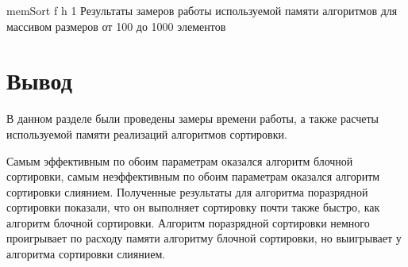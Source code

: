 \clearpage

{memSort} %
{f} %
{h} %
{1\textwidth} %
{Результаты замеров работы используемой памяти алгоритмов для массивом размеров от 100 до 1000 элементов} %

\section*{Вывод}

В данном разделе были проведены замеры времени работы, а также расчеты используемой памяти реализаций алгоритмов сортировки. 

Самым эффективным по обоим параметрам оказался алгоритм блочной сортировки, самым неэффективным по обоим параметрам оказался алгоритм сортировки слиянием. Полученные результаты для алгоритма поразрядной сортировки показали, что он выполняет сортировку почти также быстро, как алгоритм блочной сортировки. Алгоритм поразрядной сортировки немного проигрывает по расходу памяти алгоритму блочной сортировки, но выигрывает у алгоритма сортировки слиянием.

